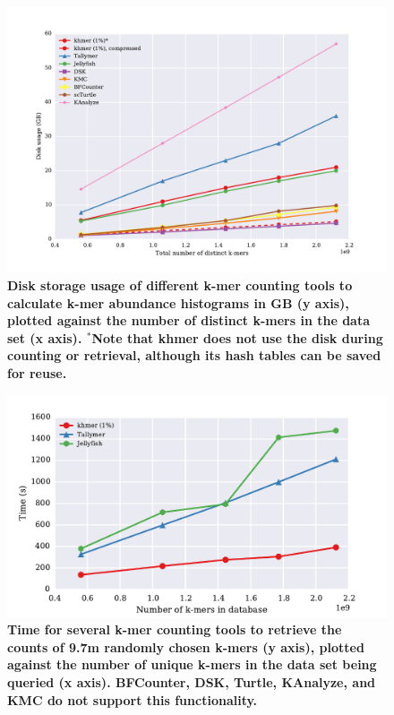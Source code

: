 \documentclass[10pt]{article}
\begin{document}
\begin{figure}[!ht]
\centerline{\includegraphics[width=5in]{./figure/disk_benchmark}}

\caption{\bf Disk storage usage of different k-mer counting tools to
  calculate k-mer abundance histograms in GB (y axis), plotted against
  the number of distinct k-mers in the data set (x axis).  $^*$Note
  that khmer does not use the disk during counting or retrieval,
  although its hash tables can be saved for reuse.}

\label{fig:cmp_disk}
\end{figure}

\begin{figure}[!ht]
\centerline{\includegraphics[width=5in]{./figure/count_benchmark}}
\caption{\bf Time for several k-mer counting tools to retrieve the
  counts of 9.7m randomly chosen k-mers (y axis), plotted against the
  number of unique k-mers in the data set being queried (x axis).
  BFCounter, DSK, Turtle, KAnalyze, and KMC do not support this functionality.}
\label{fig:cmp_count}
\end{figure}
\end{document}
